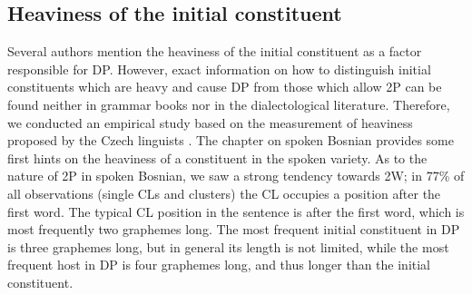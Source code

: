 \subsection{Heaviness of the initial constituent}
\label{sec:10.2.5}
Several authors mention the heaviness of the initial constituent as a factor responsible for DP. However, exact information on how to distinguish initial constituents which are heavy and cause DP from those which allow 2P can be found neither in grammar books nor in the dialectological literature. Therefore, we conducted an empirical study based on the measurement of heaviness proposed by the Czech linguists \citet{KCN18}. The chapter on spoken Bosnian provides some first hints on the heaviness of a constituent in the spoken variety. As to the nature of 2P in spoken Bosnian, we saw a strong tendency towards 2W; in 77\% of all observations (single CLs and clusters) the CL occupies a position after the first word. The typical CL position in the sentence is after the first word, which is most frequently two graphemes long. The most frequent initial constituent in DP is three graphemes long, but in general its length is not limited, while the most frequent host in DP is four graphemes long, and thus longer than the initial constituent. 
